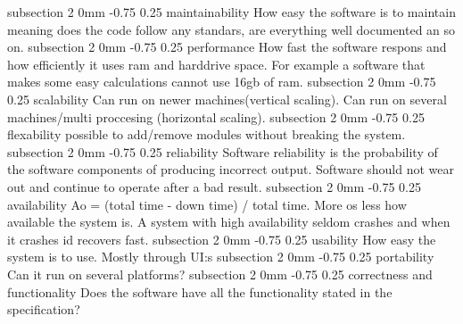 \documentclass[a4paper,11pt]{article}
\makeatletter
\renewcommand{\subsection}{\@startsection
   {subsection}%
   {2}%
   {0mm}%
   {-0.75\baselineskip}%
   {0.25\baselineskip}%
   {\rmfamily\normalfont\slshape\normalsize}}%
\makeatother
\begin{document}
\subsection{maintainability}
How easy the software is to maintain meaning does the code follow any standars, are everything well documented an so on.
\subsection{performance}
How fast the software respons and how efficiently it uses ram and harddrive space. For example a software that makes some easy calculations cannot use 16gb of ram.
\subsection{scalability}
Can run on newer machines(vertical scaling). Can run on several machines/multi proccesing (horizontal scaling).
\subsection{flexability}
possible to add/remove modules without breaking the system. 
\subsection{reliability}
Software reliability is the probability of the software components of producing incorrect output. Software should not wear out and continue to operate after a bad result.
\subsection{availability}
Ao = (total time - down time) / total time.
More os less how available the system is. A system with high availability seldom crashes and when it crashes id recovers fast.
\subsection{usability}
How easy the system is to use. Mostly through UI:s
\subsection{portability}
Can it run on several platforms?
\subsection{correctness and functionality}
Does the software have all the functionality stated in the specification?
\end{document}
